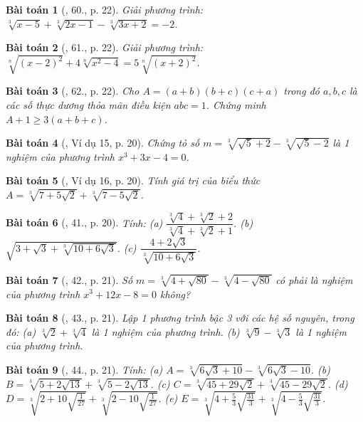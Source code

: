 \documentclass{article}
\newtheorem{baitoan}{Bài toán}
\begin{document}
\begin{baitoan}[\cite{Tuyen_Toan_9}, 60., p. 22]
	Giải phương trình: $\sqrt[3]{x - 5} + \sqrt[3]{2x - 1} - \sqrt[3]{3x + 2} = -2$.
\end{baitoan}

\begin{baitoan}[\cite{Tuyen_Toan_9}, 61., p. 22]
	Giải phương trình: $\sqrt[n]{(x - 2)^2} + 4\sqrt[n]{x^2 - 4} = 5\sqrt[n]{(x + 2)^2}$.
\end{baitoan}

\begin{baitoan}[\cite{Tuyen_Toan_9}, 62., p. 22]
	Cho $A = (a + b)(b + c)(c + a)$ trong đó $a,b,c$ là các số thực dương thỏa mãn điều kiện $abc = 1$. Chứng minh $A + 1\ge3(a + b + c)$.
\end{baitoan}

\begin{baitoan}[\cite{Binh_Toan_9_tap_1}, Ví dụ 15, p. 20]
	Chứng tỏ số $m = \sqrt[3]{\sqrt{5} + 2} - \sqrt[3]{\sqrt{5} - 2}$ là 1 nghiệm của phương trình $x^3 + 3x - 4 = 0$.
\end{baitoan}

\begin{baitoan}[\cite{Binh_Toan_9_tap_1}, Ví dụ 16, p. 20]
	Tính giá trị của biểu thức $A = \sqrt[3]{7 + 5\sqrt{2}} + \sqrt[3]{7 - 5\sqrt{2}}$.
\end{baitoan}

\begin{baitoan}[\cite{Binh_Toan_9_tap_1}, 41., p. 20]
	Tính: (a) $\dfrac{\sqrt[3]{4} + \sqrt[3]{2} + 2}{\sqrt[3]{4} + \sqrt[3]{2} + 1}$. (b) $\sqrt{3 + \sqrt{3} + \sqrt[3]{10 + 6\sqrt{3}}}$. (c) $\dfrac{4 + 2\sqrt{3}}{\sqrt[3]{10 + 6\sqrt{3}}}$.
\end{baitoan}

\begin{baitoan}[\cite{Binh_Toan_9_tap_1}, 42., p. 21]
	Số $m = \sqrt[3]{4 + \sqrt{80}} - \sqrt[3]{4 - \sqrt{80}}$ có phải là nghiệm của phương trình $x^3 + 12x - 8 = 0$ không?
\end{baitoan}

\begin{baitoan}[\cite{Binh_Toan_9_tap_1}, 43., p. 21]
	Lập 1 phương trình bậc 3 với các hệ số nguyên, trong đó: (a) $\sqrt[3]{2} + \sqrt[3]{4}$ là 1 nghiệm của phương trình. (b) $\sqrt[3]{9} - \sqrt[3]{3}$ là 1 nghiệm của phương trình.
\end{baitoan}

\begin{baitoan}[\cite{Binh_Toan_9_tap_1}, 44., p. 21]
	Tính: (a) $A = \sqrt[3]{6\sqrt{3} + 10} - \sqrt[3]{6\sqrt{3} - 10}$. (b) $B = \sqrt[3]{5 + 2\sqrt{13}} + \sqrt[3]{5 - 2\sqrt{13}}$. (c) $C = \sqrt[3]{45 + 29\sqrt{2}} + \sqrt[3]{45 - 29\sqrt{2}}$. (d) $D = \sqrt[3]{2 + 10\sqrt{\frac{1}{27}}} + \sqrt[3]{2 - 10\sqrt{\frac{1}{27}}}$. (e) $E = \sqrt[3]{4 + \frac{5}{3}\sqrt{\frac{31}{3}}} + \sqrt[3]{4 - \frac{5}{3}\sqrt{\frac{31}{3}}}$.
\end{baitoan}
\end{document}
